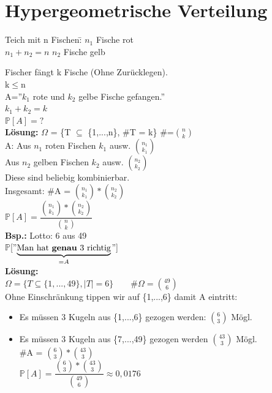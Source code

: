 \section{Hypergeometrische Verteilung}
\begin{tabbing}
	Teich mit n Fischen:\hspace{1cm}\= $n_1$ Fische rot\\
	$n_1 + n_2 = n$ \>$n_2$ Fische gelb
\end{tabbing}
Fischer fängt k Fische (Ohne Zurücklegen).\\
k$\leq$n\medskip\\
A=''$k_1$ rote und $k_2$ gelbe Fische gefangen.''\\
$k_1 + k_2 = k$\medskip\\
$\mathds{P}[A] = ?$\smallskip\\
\textbf{Lösung:} $\Omega$ = \{T $\subseteq$ \{1,...,n\}, \#T = k\}\hspace{5mm} \#=$\binom{n}{k}$\medskip\\
A: Aus $n_1$ roten Fischen $k_1$ ausw. $\binom{n_1}{k_1}$\\
Aus $n_2$ gelben Fischen $k_2$ ausw. $\binom{n_2}{k_2}$\\
Diese sind beliebig kombinierbar.\\
Insgesamt: \#A = $\binom{n_1}{k_1}*\binom{n_2}{k_2}$\\
$\mathds{P}[A] = \dfrac{\binom{n_1}{k_1}*\binom{n_2}{k_2}}{\binom{n}{k}}$\medskip\\
\textbf{Bsp.:} Lotto: 6 aus 49\\
$\mathds{P}$[''$\underbrace{\text{Man hat \textbf{genau} 3 richtig}}_{=A}$'']\\
\textbf{Lösung:}\\
$\Omega = \{T \subseteq \{1,...,49\},|T| = 6\} \qquad \#\Omega = \binom{49}{6}$\\
 Ohne Einschränkung tippen wir auf \{1,...,6\} damit A eintritt:
\begin{itemize}
\item Es müssen 3 Kugeln aus \{1,...,6\} gezogen werden: $\binom{6}{3}$ Mögl.
\item Es müssen 3 Kugeln aus \{7,...,49\} gezogen werden $\binom{43}{3}$ Mögl.\\
\#A = $\binom{6}{3}*\binom{43}{3}$\smallskip\\
$\mathds{P}[A] = \dfrac{\binom{6}{3}*\binom{43}{3}}{\binom{49}{6}}\approx 0,0176$
\end{itemize}
